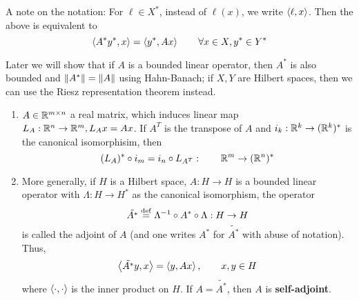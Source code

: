 \documentclass{article}
\begin{document}
A note on the notation: For \(\ell \in X^*\), instead of \(\ell(x)\), we write \(\left<{\ell},{x}\right>\). Then the above is equivalent to
\[\left<{A^* y^*},{x}\right> = \left<{y^*},{A x}\right> \qquad \forall x \in X, y^* \in Y^*\]  

Later we will show that if \(A\) is a bounded linear operator, then \(A^*\) is also bounded and \(\left\|{A^*}\right\|=\left\|{A}\right\|\)
using Hahn-Banach; if \(X, Y\) are Hilbert spaces, then we can use the Riesz representation theorem instead.

\begin{example}
    \begin{enumerate}[1)]
        \item \(A \in \mathbb{R}^{m \times n}\) a real matrix, which induces linear map \(L_A: \mathbb{R}^n \to \mathbb{R}^m, L_Ax=Ax\).
              If \(A^T\) is the transpose of \(A\) and \(i_k: \mathbb{R}^k \to (\mathbb{R}^k)^* \) is the canonical isomorphisim, then
              \[(L_A)^* \circ i_m = i_n \circ L_{A^T}: \qquad \mathbb{R}^m \to (\mathbb{R}^n)^*\]
        \item More generally, if \(H\) is a Hilbert space, \(A: H \to H\) is a bounded linear operator with \(\Lambda: H\to H^*\) as the
                canonical isomorphism, the operator
                \[\tilde{A^*} \overset{\rm{def}}{=} \Lambda^{-1} \circ A^* \circ \Lambda: H \to H\]
            is called the adjoint of \(A\) (and one writes \(A^*\) for \(\tilde{A^*}\) with abuse of notation). Thus,
            \[\left<{\Tilde{A^*}y},{x}\right> = \left<{y},{Ax}\right>, \qquad x,y \in H\]
            where \(\left<{\cdot},{\cdot}\right>\) is the inner product on \(H\). If \(A=\tilde{A^*}\), then \(A\) is \textbf{self-adjoint}.
    \end{enumerate}
\end{example}  
\end{document}
